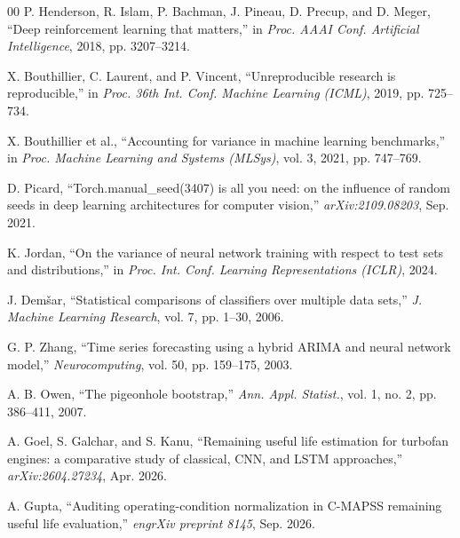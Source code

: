 \documentclass[conference]{IEEEtran}
\begin{document}
\begin{thebibliography}{00}
 P. Henderson, R. Islam, P. Bachman, J. Pineau, D. Precup, and D. Meger, ``Deep reinforcement learning that matters,'' in \emph{Proc. AAAI Conf. Artificial Intelligence}, 2018, pp. 3207--3214.

 X. Bouthillier, C. Laurent, and P. Vincent, ``Unreproducible research is reproducible,'' in \emph{Proc. 36th Int. Conf. Machine Learning (ICML)}, 2019, pp. 725--734.

 X. Bouthillier et al., ``Accounting for variance in machine learning benchmarks,'' in \emph{Proc. Machine Learning and Systems (MLSys)}, vol. 3, 2021, pp. 747--769.

 D. Picard, ``Torch.manual\_seed(3407) is all you need: on the influence of random seeds in deep learning architectures for computer vision,'' \emph{arXiv:2109.08203}, Sep. 2021.

 K. Jordan, ``On the variance of neural network training with respect to test sets and distributions,'' in \emph{Proc. Int. Conf. Learning Representations (ICLR)}, 2024.

 J. Dem\v{s}ar, ``Statistical comparisons of classifiers over multiple data sets,'' \emph{J. Machine Learning Research}, vol. 7, pp. 1--30, 2006.

 G. P. Zhang, ``Time series forecasting using a hybrid ARIMA and neural network model,'' \emph{Neurocomputing}, vol. 50, pp. 159--175, 2003.

 A. B. Owen, ``The pigeonhole bootstrap,'' \emph{Ann. Appl. Statist.}, vol. 1, no. 2, pp. 386--411, 2007.

 A. Goel, S. Galchar, and S. Kanu, ``Remaining useful life estimation for turbofan engines: a comparative study of classical, CNN, and LSTM approaches,'' \emph{arXiv:2604.27234}, Apr. 2026.

 A. Gupta, ``Auditing operating-condition normalization in C-MAPSS remaining useful life evaluation,'' \emph{engrXiv preprint 8145}, Sep. 2026.

\end{thebibliography}
\end{document}
